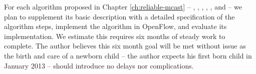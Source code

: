 

For each algorithm proposed in Chapter \ref{ch:reliable-mcast} -- \mdrs, \fls, \pcnts, \mfs, \mds, and \mc -- we plan to supplement its basic description with a detailed 
specification of the algorithm steps, implement the algorithm in OpenFlow, and evaluate its implementation.  We estimate this requires six months of steady work to complete.  
The author believes this six month goal will be met without issue as the birth and care of a newborn child -- the author expects his first born child in January 2013 --
should introduce no delays nor complications.
